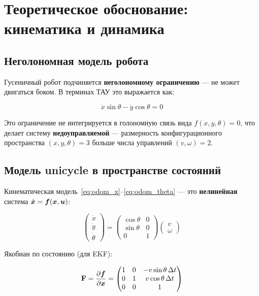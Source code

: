 \section{Теоретическое обоснование: кинематика и динамика}

\subsection{Неголономная модель робота}

Гусеничный робот подчиняется \textbf{неголономному ограничению} ---
не может двигаться боком. В терминах ТАУ это выражается как:

\begin{equation}
  \dot{x}\sin\theta - \dot{y}\cos\theta = 0
  \label{eq:nonholonomic}
\end{equation}

Это ограничение не интегрируется в голономную связь вида $f(x, y, \theta) = 0$,
что делает систему \textbf{недоуправляемой} --- размерность конфигурационного
пространства $(x, y, \theta) = 3$ больше числа управлений $(v, \omega) = 2$.

\subsection{Модель unicycle в пространстве состояний}

Кинематическая модель~\eqref{eq:odom_x}--\eqref{eq:odom_theta} ---
это \textbf{нелинейная} система $\dot{\bm{x}} = \bm{f}(\bm{x}, \bm{u})$:

\begin{equation}
  \begin{pmatrix} \dot{x} \\ \dot{y} \\ \dot{\theta} \end{pmatrix}
  = \begin{pmatrix} \cos\theta & 0 \\ \sin\theta & 0 \\ 0 & 1 \end{pmatrix}
  \begin{pmatrix} v \\ \omega \end{pmatrix}
  \label{eq:unicycle_ss}
\end{equation}

Якобиан по состоянию (для EKF):

\begin{equation}
  \mathbf{F} = \frac{\partial \bm{f}}{\partial \bm{x}} =
  \begin{pmatrix}
    1 & 0 & -v\sin\theta\,\Delta t \\
    0 & 1 & v\cos\theta\,\Delta t \\
    0 & 0 & 1
  \end{pmatrix}
  \label{eq:unicycle_jacobian}
\end{equation}

